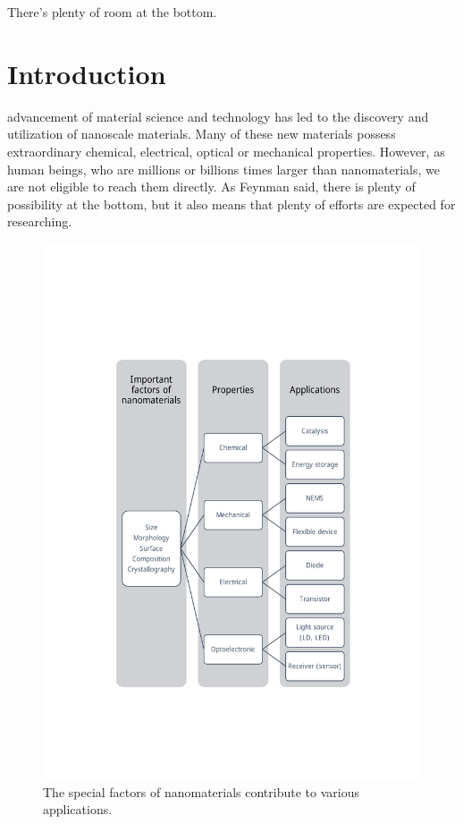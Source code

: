 
\begin{savequote}[75mm] 
There's plenty of room at the bottom.
\end{savequote}

\chapter{Introduction}
 advancement of material science and technology has led to the discovery and utilization of nanoscale materials. Many of these new materials possess extraordinary chemical, electrical, optical or mechanical properties. However, as human beings, who are millions or billions times larger than nanomaterials, we are not eligible to reach them directly. As Feynman said, there is plenty of possibility at the bottom, but it also means that plenty of efforts are expected for researching. 

\begin{figure}  
\includegraphics[width=320pt]{figures/figure1_factors}
\caption[Factors and applications]{The special factors of nanomaterials contribute to various applications. 
\label{fig:1_factor}}
\end{figure}

